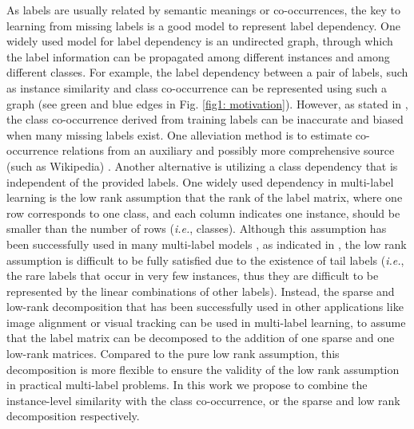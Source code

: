 \documentclass[twocolumn]{svjour3}          %
\begin{document}
As labels are usually related by semantic meanings or co-occurrences,
the key to learning from missing labels is a
good model to represent label dependency. One widely used model for label dependency is an undirected graph, through which the label information can be propagated among different instances and among different classes.
For example, the label dependency between a pair of labels, such as instance similarity and class co-occurrence can be represented using such a graph (see green and blue edges in Fig. \ref{fig1: motivation}).
%
However, as stated in \cite{my-icpr-2014,my-pr-2015}, the class co-occurrence derived from training labels can be inaccurate and biased when many missing labels exist. 
One alleviation method is to estimate co-occurrence relations from an auxiliary and possibly more comprehensive source (such as Wikipedia) \cite{crbm-mlml-2015}. 
%
Another alternative is utilizing a class dependency that is independent of the provided labels. One widely used dependency in multi-label learning is the low rank assumption that the rank of the label matrix, where one row corresponds to one class, and each column indicates one instance, should be smaller than the number of rows ({\it i.e.}, classes). Although this assumption has been successfully used in many multi-label models \cite{multilabel-compressed-sensing-nips-2012,LEML-ICML-2014}, as indicated in \cite{multilabel-low-rank-sparse-kdd-2016}, the low rank assumption is difficult to be fully satisfied due to the existence of tail labels ({\it i.e.}, the rare labels that occur in very few instances, thus they are difficult to be represented by the linear combinations of other labels). 
Instead, the sparse and low-rank decomposition that has been successfully used in other applications like image alignment \cite{image-alignment-pami-2012} or visual tracking \cite{tianzhu-sparse-coding-eccv-2012} can be used in multi-label learning, to assume that the label matrix can be decomposed to the addition of one sparse and one low-rank matrices.  
Compared to the pure low rank assumption, this decomposition is more flexible to ensure the validity of the low rank assumption in practical multi-label problems. 
In this work we propose to combine the instance-level similarity with the class co-occurrence, or the sparse and low rank decomposition respectively. 
\end{document}
